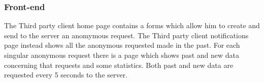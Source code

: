 \subsubsection*{Front-end}
The Third party client home page contains a forms which allow him to create and send to the server an anomymous request.
The Third party client notifications page instead shows all the anonymous requested made in the past. For each singular anonymous request there is a page which shows past and new data concerning that requests and some statistics. Both past and new data are requested every 5 seconds to the server.